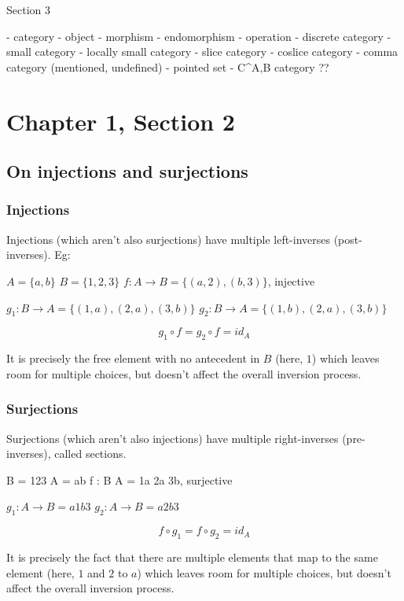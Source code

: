 \documentclass[12pt, letterpaper, twoside]{article}
\begin{document}
Section 3

  - category
  - object
  - morphism
  - endomorphism
  - operation
  - discrete category
  - small category
  - locally small category
  - slice category
  - coslice category
  - comma category (mentioned, undefined)
  - pointed set
  - C^A,B category ??\section{Chapter 1, Section 2}

\subsection{On injections and surjections}

\subsubsection{Injections}

Injections (which aren't also surjections) have multiple left-inverses (post-inverses). Eg:

$A = \{ a, b    \}$
$B = \{ 1, 2, 3 \}$
$f : A \to B = \{ (a, 2), (b, 3) \}$, injective

$g_1 : B \to A = \{ (1, a), (2, a), (3, b) \}$
$g_2 : B \to A = \{ (1, b), (2, a), (3, b) \}$

$$g_1 \circ f = g_2 \circ f = id_A$$

It is precisely the free element with no antecedent in $B$ (here, $1$) which leaves room for multiple choices, but doesn't affect the overall inversion process.


\subsubsection{Surjections}

Surjections (which aren't also injections) have multiple right-inverses (pre-inverses), called sections.

B = 123
A = ab
f : B \to A = 1a 2a 3b, surjective

$g_1 : A \to B = a1 b3$
$g_2 : A \to B = a2 b3$

$$f \circ g_1 = f \circ g_2 = id_A$$

It is precisely the fact that there are multiple elements that map to the same element (here, $1$ and $2$ to $a$) which leaves room for multiple choices, but doesn't affect the overall inversion process.
\end{document}
